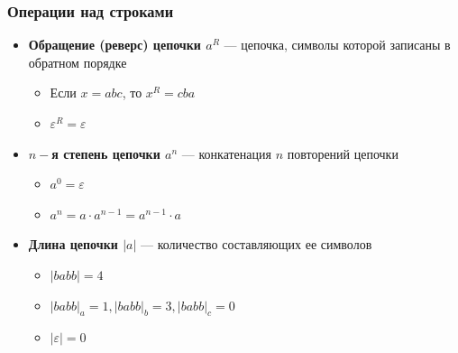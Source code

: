 \documentclass{beamer}
\begin{document}
\begin{frame}[fragile]
  \transwipe[direction=90]
  \frametitle{Операции над строками}
  \begin{itemize}
    \item \textbf{Обращение (реверс) цепочки $a^R$} --- цепочка, символы которой записаны в обратном порядке
    \begin{itemize}
      \item Если $x = abc$, то $x^R = cba$
      \item $\varepsilon^R = \varepsilon$
    \end{itemize}
    \item \textbf{$n-$я степень цепочки $a^n$} --- конкатенация $n$ повторений цепочки
    \begin{itemize}
      \item $a^0 = \varepsilon$
      \item $a^n = a \cdot a^{n-1} = a^{n-1} \cdot a$
    \end{itemize}
    \item \textbf{Длина цепочки $|a|$} --- количество составляющих ее символов
    \begin{itemize}
      \item $|babb| = 4$
      \item $|babb|_a = 1, |babb|_b = 3, |babb|_c = 0$
      \item $|\varepsilon| = 0$
    \end{itemize}
  \end{itemize}
\end{frame}
\end{document}
